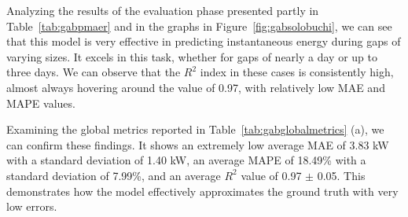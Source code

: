 Analyzing the results of the evaluation phase presented partly in Table~\ref{tab:gabpmaer} and in the graphs in Figure~\ref{fig:gabsolobuchi}, we can see that this model is very effective in predicting instantaneous energy during gaps of varying sizes. It excels in this task, whether for gaps of nearly a day or up to three days. We can observe that the $R^2$ index in these cases is consistently high, almost always hovering around the value of 0.97, with relatively low MAE and MAPE values.

Examining the global metrics reported in Table~\ref{tab:gabglobalmetrics} (a), we can confirm these findings. It shows an extremely low average MAE of 3.83 kW with a standard deviation of 1.40 kW, an average MAPE of 18.49\% with a standard deviation of 7.99\%, and an average $R^2$ value of 0.97 $\pm$ 0.05. This demonstrates how the model effectively approximates the ground truth with very low errors.


